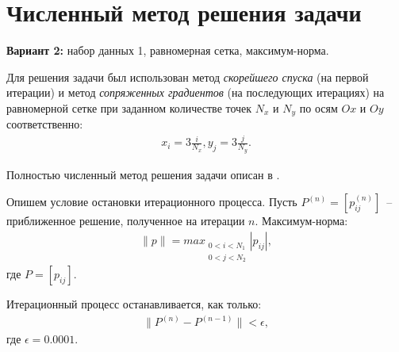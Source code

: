 \section{Численный метод решения задачи}

\textbf{Вариант 2:} набор данных 1, равномерная сетка, максимум-норма.

Для решения задачи был использован метод \textit{скорейшего спуска} (на первой итерации) и метод \textit{сопряженных градиентов} (на последующих итерациях) на равномерной сетке при заданном количестве точек $N_x$ и $N_y$ по осям $Ox$ и $Oy$ соответственно:
\begin{gather}x_i = 3\frac{i}{N_x}, y_j = 3\frac{j}{N_y}.\end{gather}

Полностью численный метод решения задачи описан в \cite{task_pdf}.

Опишем условие остановки итерационного процесса. Пусть $P^{(n)}= [p_{ij}^{(n)}]$~-- приближенное решение, полученное на итерации $n$. Максимум-норма:
\begin{gather}\parallel p\parallel = max_{\substack{0 < i < N_1 \\ 0 < j < N_2}} |p_{ij}|,\end{gather}
где $P = [p_{ij}]$.

Итерационный процесс останавливается, как только:
\begin{equation}
  \begin{gathered}\parallel P^{(n)} - P^{(n - 1)}\parallel < \epsilon,\end{gathered}
  \label{eq:stop}
\end{equation}
где $\epsilon = 0.0001$.

\clearpage
